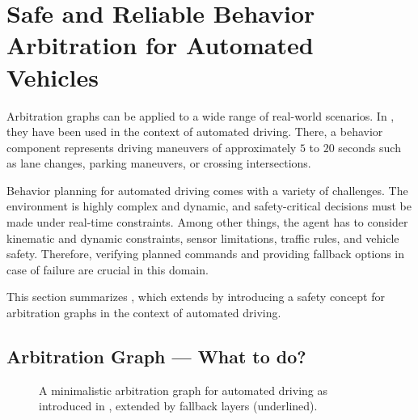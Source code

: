 \section{Safe and Reliable Behavior Arbitration for Automated Vehicles}




Arbitration graphs can be applied to a wide range of real-world scenarios.
In \cite{orzechowskiDecisionMakingAutomatedVehicles2020a},
they have been used in the context of automated driving.
There, a behavior component represents driving maneuvers of approximately $5$ to $20$ seconds
such as lane changes, parking maneuvers, or crossing intersections.

Behavior planning for automated driving comes with a variety of challenges.
The environment is highly complex and dynamic, and safety-critical decisions must be made under real-time constraints.
Among other things, the agent has to consider kinematic and dynamic constraints,
sensor limitations, traffic rules, and vehicle safety.
Therefore, verifying planned commands and providing fallback options in case of failure are crucial in this domain.

This section summarizes \cite{orzechowskiVerhaltensentscheidungFuerAutomatisierte2023},
which extends \cite{orzechowskiDecisionMakingAutomatedVehicles2020a} by
introducing a safety concept for arbitration graphs in the context of automated driving.




\subsection{Arbitration Graph --- \textbf{What} to do?}

\begin{figure}
    \centering
    
    \caption{
        A minimalistic arbitration graph for automated driving as introduced in \cite{orzechowskiDecisionMakingAutomatedVehicles2020a}, extended by fallback layers (underlined).
    }
    \label{fig:arbitration-graph-evaluation}
\end{figure}

